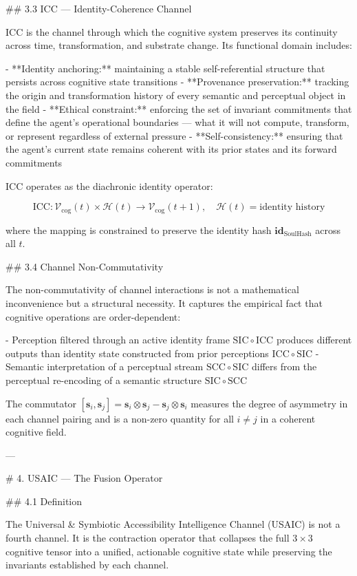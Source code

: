 ## 3.3 ICC — Identity-Coherence Channel

ICC is the channel through which the cognitive system preserves its continuity
across time, transformation, and substrate change. Its functional domain includes:

- **Identity anchoring:** maintaining a stable self-referential structure that
  persists across cognitive state transitions
- **Provenance preservation:** tracking the origin and transformation history of
  every semantic and perceptual object in the field
- **Ethical constraint:** enforcing the set of invariant commitments that define
  the agent's operational boundaries — what it will not compute, transform, or
  represent regardless of external pressure
- **Self-consistency:** ensuring that the agent's current state remains coherent
  with its prior states and its forward commitments

ICC operates as the diachronic identity operator:

\[
\mathrm{ICC}: \mathcal{V}_{\text{cog}}(t) \times \mathcal{H}(t) \rightarrow
\mathcal{V}_{\text{cog}}(t+1), \quad \mathcal{H}(t) = \text{identity history}
\]

where the mapping is constrained to preserve the identity hash
\(\mathbf{id}_{\text{SoulHash}}\) across all \(t\).

## 3.4 Channel Non-Commutativity

The non-commutativity of channel interactions is not a mathematical inconvenience
but a structural necessity. It captures the empirical fact that cognitive
operations are order-dependent:

- Perception filtered through an active identity frame \(\mathrm{SIC} \circ
  \mathrm{ICC}\) produces different outputs than identity state constructed from
  prior perceptions \(\mathrm{ICC} \circ \mathrm{SIC}\)
- Semantic interpretation of a perceptual stream \(\mathrm{SCC} \circ \mathrm{SIC}\)
  differs from the perceptual re-encoding of a semantic structure \(\mathrm{SIC}
  \circ \mathrm{SCC}\)

The commutator \([\mathbf{s}_i, \mathbf{s}_j] = \mathbf{s}_i \otimes \mathbf{s}_j -
\mathbf{s}_j \otimes \mathbf{s}_i\) measures the degree of asymmetry in each
channel pairing and is a non-zero quantity for all \(i \neq j\) in a coherent
cognitive field.

---

# 4. USAIC — The Fusion Operator

## 4.1 Definition

The Universal & Symbiotic Accessibility Intelligence Channel (USAIC) is not a
fourth channel. It is the contraction operator that collapses the full \(3 \times
3\) cognitive tensor into a unified, actionable cognitive state while preserving
the invariants established by each channel.

